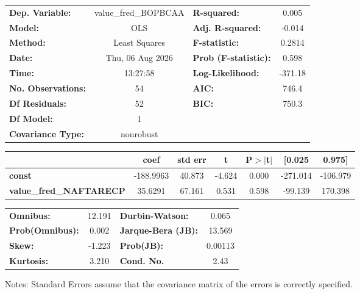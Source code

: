 \begin{center}
\begin{tabular}{lclc}
\toprule
\textbf{Dep. Variable:}         & value\_fred\_BOPBCAA & \textbf{  R-squared:         } &     0.005   \\
\textbf{Model:}                 &         OLS          & \textbf{  Adj. R-squared:    } &    -0.014   \\
\textbf{Method:}                &    Least Squares     & \textbf{  F-statistic:       } &    0.2814   \\
\textbf{Date:}                  &   Thu, 06 Aug 2026   & \textbf{  Prob (F-statistic):} &    0.598    \\
\textbf{Time:}                  &       13:27:58       & \textbf{  Log-Likelihood:    } &   -371.18   \\
\textbf{No. Observations:}      &            54        & \textbf{  AIC:               } &     746.4   \\
\textbf{Df Residuals:}          &            52        & \textbf{  BIC:               } &     750.3   \\
\textbf{Df Model:}              &             1        & \textbf{                     } &             \\
\textbf{Covariance Type:}       &      nonrobust       & \textbf{                     } &             \\
\bottomrule
\end{tabular}
\begin{tabular}{lcccccc}
                                & \textbf{coef} & \textbf{std err} & \textbf{t} & \textbf{P$> |$t$|$} & \textbf{[0.025} & \textbf{0.975]}  \\
\midrule
\textbf{const}                  &    -188.9963  &       40.873     &    -4.624  &         0.000        &     -271.014    &     -106.979     \\
\textbf{value\_fred\_NAFTARECP} &      35.6291  &       67.161     &     0.531  &         0.598        &      -99.139    &      170.398     \\
\bottomrule
\end{tabular}
\begin{tabular}{lclc}
\textbf{Omnibus:}       & 12.191 & \textbf{  Durbin-Watson:     } &    0.065  \\
\textbf{Prob(Omnibus):} &  0.002 & \textbf{  Jarque-Bera (JB):  } &   13.569  \\
\textbf{Skew:}          & -1.223 & \textbf{  Prob(JB):          } &  0.00113  \\
\textbf{Kurtosis:}      &  3.210 & \textbf{  Cond. No.          } &     2.43  \\
\bottomrule
\end{tabular}
\end{center}

Notes: \newline
 [1] Standard Errors assume that the covariance matrix of the errors is correctly specified.
